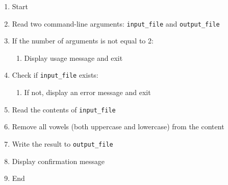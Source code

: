 \begin{enumerate}
    \item Start
    \item Read two command-line arguments: \texttt{input\_file} and \texttt{output\_file}
    \item If the number of arguments is not equal to 2:
    \begin{enumerate}
        \item Display usage message and exit
    \end{enumerate}
    \item Check if \texttt{input\_file} exists:
    \begin{enumerate}
        \item If not, display an error message and exit
    \end{enumerate}
    \item Read the contents of \texttt{input\_file}
    \item Remove all vowels (both uppercase and lowercase) from the content
    \item Write the result to \texttt{output\_file}
    \item Display confirmation message
    \item End
\end{enumerate}


